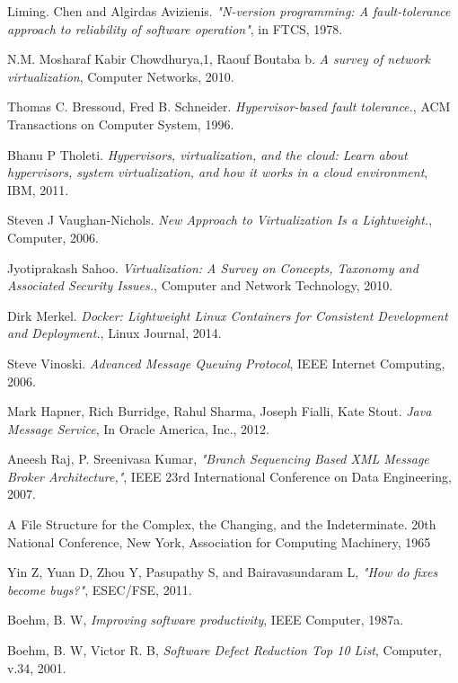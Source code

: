 \documentclass[a4paper,11pt,twoside]{report}
\begin{document}
\begin{thebibliography}{1}
 	 Liming. Chen and Algirdas Avizienis. {\em  "N-version programming: A fault-tolerance approach to reliability of software operation"}, in FTCS, 1978. 
   
	 N.M. Mosharaf Kabir Chowdhurya,1, Raouf Boutaba b. {\em A survey of network virtualization}, Computer Networks, 2010.
   
	 Thomas C. Bressoud, Fred B. Schneider. {\em Hypervisor-based fault tolerance.}, ACM 	Transactions on Computer System, 1996.
	   
  	 Bhanu P Tholeti. {\em Hypervisors, virtualization, and the cloud: Learn about hypervisors, system virtualization, and how it works in a cloud environment}, IBM, 2011. 

	  Steven J Vaughan-Nichols. {\em New Approach to Virtualization Is a Lightweight.}, Computer, 2006.  
	 
	   Jyotiprakash Sahoo. {\em Virtualization: A Survey on Concepts, Taxonomy and Associated Security Issues.}, Computer and Network Technology, 2010.
  
    Dirk Merkel. {\em Docker: Lightweight Linux Containers for Consistent Development and Deployment.}, Linux Journal, 2014.
	
	 Steve Vinoski. {\em Advanced Message Queuing Protocol}, IEEE Internet Computing, 2006. 

     Mark Hapner, Rich Burridge, Rahul Sharma, Joseph Fialli, Kate Stout. {\em Java Message Service}, In Oracle America, Inc., 2012.

 Aneesh Raj, P. Sreenivasa Kumar, {\em "Branch Sequencing Based XML Message Broker Architecture,"}, IEEE 23rd International Conference on Data Engineering, 2007.  

 A File Structure for the Complex, the Changing, and the Indeterminate. 20th National Conference, New York, Association for Computing Machinery, 1965

Yin Z, Yuan D, Zhou Y, Pasupathy S, and Bairavasundaram L, \textit{"How
do fixes become bugs?"}, ESEC/FSE, 2011.

Boehm, B. W, \textit{Improving software productivity}, IEEE Computer, 1987a.

 Boehm, B. W, Victor R. B, \textit{Software Defect Reduction Top 10 List}, Computer, v.34, 2001.



\end{thebibliography} 
\end{document}
